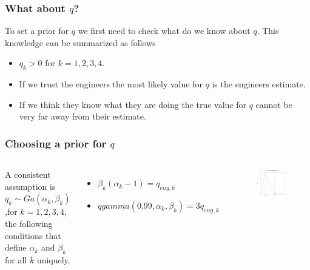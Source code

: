\documentclass[11pt]{beamer}
\theoremstyle{plain}
\theoremstyle{definition}
\begin{document}
\begin{frame}
\frametitle{What about $q$?}
To set a prior for $q$ we first need to check what do we know about $q$. This knowledge can be 
summarized as follows
\begin{itemize}
\item $q_{k}>0$ for $k=1,2,3,4$.
\item If we trust the engineers the most likely value for $q$ is the engineers estimate.
\item If we think they know what they are doing the true value for $q$ cannot be very far away from their
estimate.
\end{itemize}
\end{frame}

\begin{frame}
\frametitle{Choosing a prior for $q$}
\begin{columns}[c]
\column{2.2in}
A consistent assumption is $q_{k}\sim Ga(\alpha_{k},\beta_{k})$,for $k=1,2,3,4$,
the following conditions that define $\alpha_{k}$ and $\beta_{k}$ for all $k$ uniquely.

\begin{itemize}
\item $\beta_{k}(\alpha_{k}-1)=q_{eng,k}$
\item $qgamma(0.99,\alpha_{k},\beta_{k})=3q_{eng,k}$
\end{itemize}
\column{1.5in}
\begin{figure}
\includegraphics[scale=0.3]{gamma_generic}
\end{figure}
\end{columns}
\end{frame}
\end{document}
